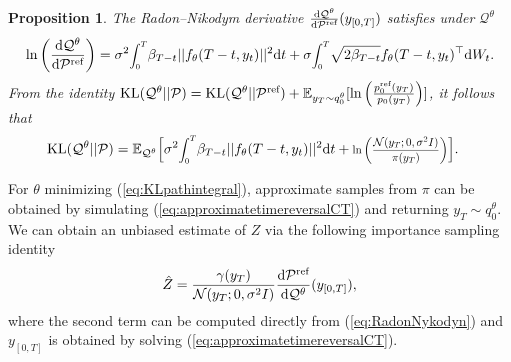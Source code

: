 \documentclass{article} %
\newtheorem{proposition}{Proposition}
\begin{document}
\begin{proposition}\label{prop:RNcontinuous}
The Radon--Nikodym derivative $\frac{\mathrm{d}\mathcal{Q}^{\theta}}{\mathrm{d}\mathcal{P}^{\textup{ref}}}(y_{[0,T]})$ satisfies under $\mathcal{Q}^{\theta}$
\begin{equation}\label{eq:RadonNykodyn}
   \log \left(\frac{\mathrm{d}\mathcal{Q}^{\theta}}{\mathrm{d}\mathcal{P}^{\textup{ref}}}\right)=\sigma^2 \scaleobj{.8}{\int_0^T}  \beta_{T-t} ||f_\theta(T-t,y_t)||^2 \mathrm{d}t+\sigma \scaleobj{.8}{\int_0^T} \sqrt{2 \beta_{T-t}} f_\theta(T-t,y_t)^\top \mathrm{d}W_t.
\end{equation}
From the identity $\mathrm{KL}(\mathcal{Q}^\theta||\mathcal{P})=\mathrm{KL}(\mathcal{Q}^\theta||\mathcal{P}^{\textup{ref}})+\mathbb{E}_{y_T \sim q^{\theta}_0}[\ln \left(\frac{p^{\textup{ref}}_0(y_T)}{p_0(y_T)}\right)]$, it follows that
\begin{align}
\KL(\mathcal{Q}^\theta||\mathcal{P})&
=\mathbb{E}_{\mathcal{Q}^\theta} \Bigr[ \sigma^2 \scaleobj{.8}{\int_0^T} \beta_{T-t} ||f_\theta(T-t,y_t)||^2 \mathrm{d}t
     +\scaleobj{.8}{\ln \left(\frac{\gN(y_T; 0, \sigma^2 I)}{\pi(y_T)}\right)} \Bigr]\label{eq:KLpathintegral}.
\end{align}
\end{proposition}

For $\theta$ minimizing (\ref{eq:KLpathintegral}), approximate samples from $\pi$ can be obtained by simulating (\ref{eq:approximatetimereversalCT}) and returning $y_T\! \sim \!q^{\theta}_0$. We can obtain an unbiased estimate of $Z$ via the following importance sampling identity
\begin{equation}\label{eq:hatZCT}
 \hat{Z}=\frac{\gamma(y_{T})}{\mathcal{N}(y_T;0,\sigma^2 I)} \frac{\mathrm{d}\mathcal{P}^{\textup{ref}}}{\mathrm{d}\mathcal{Q}^{\theta}}(y_{[0,T]}),
\end{equation}
where the second term can be computed directly from (\ref{eq:RadonNykodyn}) and $y_{[0,T]}$ is obtained by solving (\ref{eq:approximatetimereversalCT}). 
\end{document}
